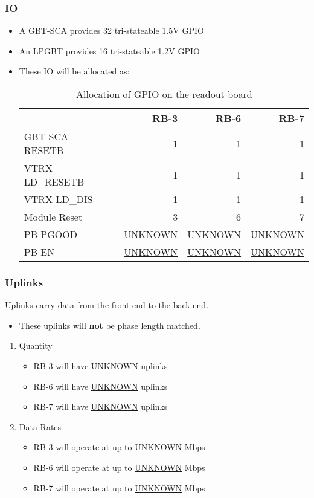 \documentclass[11pt]{article}
\begin{document}
\subsubsection{IO}
\label{sec:org74505f5}
\begin{itemize}
\item A GBT-SCA provides 32 tri-stateable 1.5V GPIO
\item An LPGBT provides 16 tri-stateable 1.2V GPIO
\item These IO will be allocated as:
\begin{table}[htbp]
\caption{Allocation of GPIO on the readout board}
\centering
\begin{tabular}{llrrr}
 &  & RB-3 & RB-6 & RB-7\\
\hline
GBT-SCA RESETB &  & 1 & 1 & 1\\
VTRX LD\_RESETB &  & 1 & 1 & 1\\
VTRX LD\_DIS &  & 1 & 1 & 1\\
Module Reset &  & 3 & 6 & 7\\
PB PGOOD &  & \uline{UNKNOWN} & \uline{UNKNOWN} & \uline{UNKNOWN}\\
PB EN &  & \uline{UNKNOWN} & \uline{UNKNOWN} & \uline{UNKNOWN}\\
\end{tabular}
\end{table}
\end{itemize}

\subsubsection{Uplinks}
\label{sec:org0244429}

Uplinks carry data from the front-end to the back-end.

\begin{itemize}
\item These uplinks will \textbf{not} be phase length matched.
\end{itemize}

\begin{enumerate}
\item Quantity
\label{sec:org827f551}
\begin{itemize}
\item RB-3 will have \uline{UNKNOWN} uplinks
\item RB-6 will have \uline{UNKNOWN} uplinks
\item RB-7 will have \uline{UNKNOWN} uplinks
\end{itemize}
\item Data Rates
\label{sec:orgaf1193f}
\begin{itemize}
\item RB-3 will operate at up to \uline{UNKNOWN} Mbps
\item RB-6 will operate at up to \uline{UNKNOWN} Mbps
\item RB-7 will operate at up to \uline{UNKNOWN} Mbps
\end{itemize}
\end{enumerate}
\end{document}
